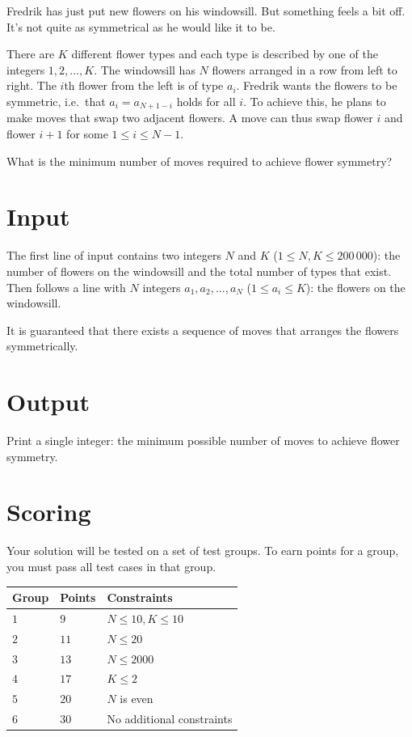 
Fredrik has just put new flowers on his windowsill. But something feels a bit off.
It's not quite as symmetrical as he would like it to be.

There are $K$ different flower types and each type is described by one of the integers $1,2,...,K$. The windowsill has $N$ flowers arranged in a row from left to right.
The $i$th flower from the left is of type $a_i$.
Fredrik wants the flowers to be symmetric, i.e.\ that $a_i=a_{N+1-i}$ holds for all $i$.
To achieve this, he plans to make moves that swap two adjacent flowers.
A move can thus swap flower $i$ and flower $i+1$ for some $1\le i \le N-1$.

What is the minimum number of moves required to achieve flower symmetry?
\section*{Input}

The first line of input contains two integers $N$ and $K$ ($1 \le N,K \le 200\,000$):
the number of flowers on the windowsill and the total number of types that exist.
Then follows a line with $N$ integers $a_1,a_2,...,a_N$ ($1\le a_i \le K$): the flowers on the windowsill.

It is guaranteed that there exists a sequence of moves that arranges the flowers symmetrically.

\section*{Output}

Print a single integer: the minimum possible number of moves to achieve flower symmetry.

\section*{Scoring}
Your solution will be tested on a set of test groups.
To earn points for a group, you must pass all test cases in that group.

\noindent
\begin{tabular}{| l | l | l |}
  \hline
  Group & Points & Constraints \\ \hline
  $1$    & $9$         &  $N\le 10, K \le 10$ \\ \hline
  $2$    & $11$        &  $N \le 20$ \\ \hline
  $3$    & $13$        &  $N \le 2000$ \\ \hline
  $4$    & $17$        &  $K \le 2$ \\ \hline
  $5$    & $20$        &  $N$ is even \\ \hline
  $6$    & $30$        &  No additional constraints \\ \hline
\end{tabular}

